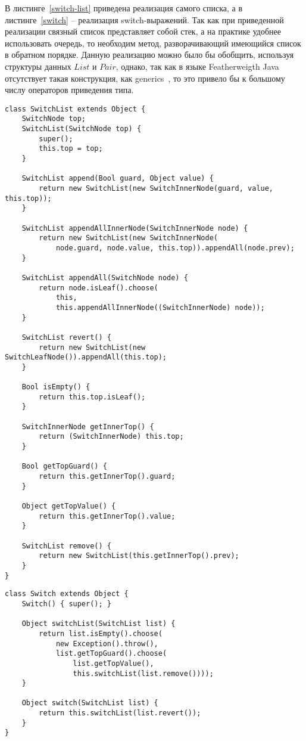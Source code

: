 В листинге~\ref{switch-list} приведена реализация самого списка, а в листинге~\ref{switch} -- реализация switch-выражений. Так как при приведенной реализации связный список представляет собой стек,
а на практике удобнее использовать очередь, то необходим метод, разворачивающий имеющийся список в обратном порядке.
Данную реализацию можно было бы обобщить, используя структуры данных $List$ и $Pair$, однако,
так как в языке Featherweigth Java отсутствует такая конструкция, как generics~\cite{java},
то это привело бы к большому числу операторов приведения типа.
\begin{lstlisting}[float,label=switch-list,caption=Определение списка пар условие-результат для switch-выражений.]
class SwitchList extends Object {
    SwitchNode top;
    SwitchList(SwitchNode top) {
        super();
        this.top = top;
    }

    SwitchList append(Bool guard, Object value) {
        return new SwitchList(new SwitchInnerNode(guard, value, this.top));
    }

    SwitchList appendAllInnerNode(SwitchInnerNode node) {
        return new SwitchList(new SwitchInnerNode(
            node.guard, node.value, this.top)).appendAll(node.prev);
    }

    SwitchList appendAll(SwitchNode node) {
        return node.isLeaf().choose(
            this,
            this.appendAllInnerNode((SwitchInnerNode) node));
    }

    SwitchList revert() {
        return new SwitchList(new SwitchLeafNode()).appendAll(this.top);
    }

    Bool isEmpty() {
        return this.top.isLeaf();
    }

    SwitchInnerNode getInnerTop() {
        return (SwitchInnerNode) this.top;
    }

    Bool getTopGuard() {
        return this.getInnerTop().guard;
    }

    Object getTopValue() {
        return this.getInnerTop().value;
    }

    SwitchList remove() {
        return new SwitchList(this.getInnerTop().prev);
    }
}
\end{lstlisting}
\begin{lstlisting}[float,label=switch,caption=Определение switch-выражений.]
class Switch extends Object {
    Switch() { super(); }

    Object switchList(SwitchList list) {
        return list.isEmpty().choose(
            new Exception().throw(),
            list.getTopGuard().choose(
                list.getTopValue(),
                this.switchList(list.remove())));
    }

    Object switch(SwitchList list) {
        return this.switchList(list.revert());
    }
}
\end{lstlisting}

